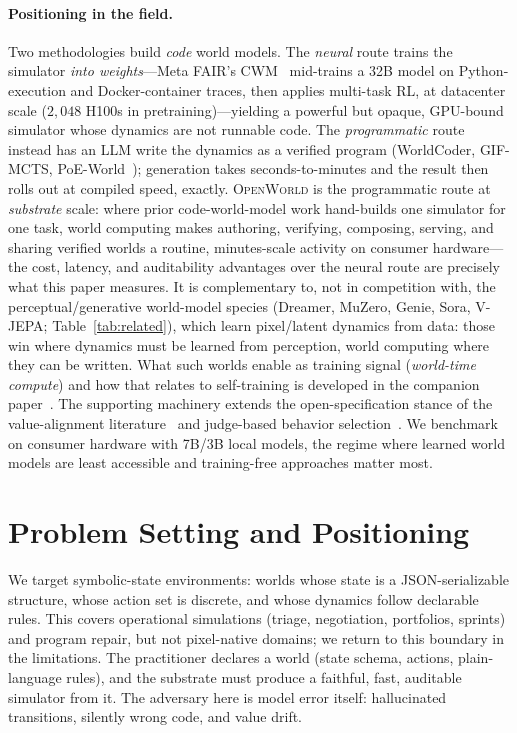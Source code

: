 \documentclass[11pt]{article}
\newcommand{\openworld}{\textsc{OpenWorld}}
\begin{document}
\paragraph{Positioning in the field.} Two methodologies build \emph{code} world models. The
\emph{neural} route trains the simulator \emph{into weights}---Meta FAIR's CWM~\cite{metacwm2025}
mid-trains a 32B model on Python-execution and Docker-container traces, then applies multi-task
RL, at datacenter scale ($2{,}048$ H100s in pretraining)---yielding a powerful but
opaque, GPU-bound simulator whose dynamics are not runnable code. The \emph{programmatic} route
instead has an LLM write the dynamics as a verified program (WorldCoder, GIF-MCTS,
PoE-World~\cite{worldcoder2024,gifmcts2024,poeworld2025}); generation takes seconds-to-minutes and
the result then rolls out at compiled speed, exactly. \openworld{} is the programmatic route at
\emph{substrate} scale: where prior code-world-model work hand-builds one simulator for one task,
world computing makes authoring, verifying, composing, serving, and
sharing verified worlds a routine, minutes-scale activity on consumer hardware---the cost,
latency, and auditability advantages over the neural route are precisely what this paper measures. It is complementary to, not in
competition with, the perceptual/generative world-model species (Dreamer, MuZero, Genie, Sora,
V-JEPA; Table~\ref{tab:related}), which learn pixel/latent dynamics from data: those win where
dynamics must be learned from perception, world computing where they can be written.
What such worlds enable as training signal (\emph{world-time compute}) and how that relates
to self-training is developed in the companion paper~\cite{openworld_wtc}. The supporting machinery extends the open-specification
stance of the value-alignment literature~\cite{spectrap2025,mas2025} and judge-based
behavior selection~\cite{agentasjudge2024}. We benchmark on consumer hardware with 7B/3B
local models, the regime where learned world models are least accessible and training-free
approaches matter most.

\section{Problem Setting and Positioning}\label{sec:problem}
We target symbolic-state environments: worlds whose state is a
JSON-serializable structure, whose action set is discrete, and whose dynamics
follow declarable rules. This covers operational simulations (triage,
negotiation, portfolios, sprints) and program repair, but not pixel-native
domains; we return to this boundary in the limitations. The practitioner
declares a world (state schema, actions, plain-language rules), and the
substrate must produce a faithful, fast, auditable simulator from it. The
adversary here is model error itself:
hallucinated transitions, silently wrong code, and value drift.
\end{document}
